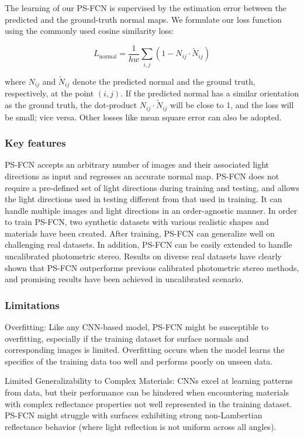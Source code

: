 The learning of our PS-FCN is supervised by the estimation error between the predicted and the ground-truth normal maps. We formulate our loss function using the commonly used cosine similarity loss:

\[
L_{\text{normal}} = \frac{1}{hw} \sum_{i,j} (1 - N_{ij} \cdot \tilde{N}_{ij})
\]

where $N_{ij}$ and $\tilde{N}_{ij}$ denote the predicted normal and the ground truth, respectively, at the point $(i, j)$. If the predicted normal has a similar orientation as the ground truth, the dot-product $N_{ij} \cdot \tilde{N}_{ij}$ will be close to 1, and the loss will be small; vice versa. Other losses like mean square error can also be adopted.

\subsubsection{Key features}
PS-FCN accepts an arbitrary number of images and their associated light directions as input and regresses an accurate normal map. PS-FCN does not require a pre-defined set of light directions during training and testing, and allows the light directions used in testing different from that used in training. It can handle multiple images and light directions in an order-agnostic manner. In order to train PS-FCN, two synthetic datasets with various realistic shapes and materials have been created. After training, PS-FCN can generalize well on challenging real datasets. In addition, PS-FCN can be easily extended to handle uncalibrated photometric stereo. Results on diverse real datasets have clearly shown that PS-FCN outperforms previous calibrated photometric stereo methods, and promising results have been achieved in uncalibrated scenario.
\subsubsection{Limitations}
Overfitting: Like any CNN-based model, PS-FCN might be susceptible to overfitting, especially if the training dataset for surface normals and corresponding images is limited. Overfitting occurs when the model learns the specifics of the training data too well and performs poorly on unseen data.

Limited Generalizability to Complex Materials: CNNs excel at learning patterns from data, but their performance can be hindered when encountering materials with complex reflectance properties not well represented in the training dataset. PS-FCN might struggle with surfaces exhibiting strong non-Lambertian reflectance behavior (where light reflection is not uniform across all angles).

